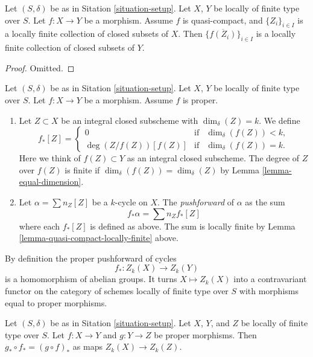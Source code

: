 \begin{lemma}
\label{lemma-quasi-compact-locally-finite}
Let $(S, \delta)$ be as in Sitation \ref{situation-setup}.
Let $X$, $Y$ be locally of finite type over $S$.
Let $f : X \to Y$ be a morphism.
Assume $f$ is quasi-compact, and $\{Z_i\}_{i \in I}$ is a locally
finite collection of closed subsets of $X$.
Then $\{\overline{f(Z_i)}\}_{i \in I}$ is a locally finite
collection of closed subsets of $Y$.
\end{lemma}

\begin{proof}
Omitted.
\end{proof}

\begin{definition}
\label{definition-proper-pushforward}
Let $(S, \delta)$ be as in Sitation \ref{situation-setup}.
Let $X$, $Y$ be locally of finite type over $S$.
Let $f : X \to Y$ be a morphism.
Assume $f$ is proper.
\begin{enumerate}
\item Let $Z \subset X$ be an integral closed subscheme
with $\dim_\delta(Z) = k$. We define
$$
f_*[Z] =
\left\{
\begin{matrix}
0 & \text{if} & \dim_\delta(f(Z))< k, \\
\deg(Z/f(Z)) [f(Z)] & \text{if} & \dim_\delta(f(Z)) = k.
\end{matrix}
\right.
$$
Here we think of $f(Z) \subset Y$ as an integral closed subscheme.
The degree of $Z$ over $f(Z)$ is finite if
$\dim_\delta(f(Z)) = \dim_\delta(Z)$
by Lemma \ref{lemma-equal-dimension}.
\item Let $\alpha = \sum n_Z [Z]$ be a $k$-cycle on $X$. The
{\it pushforward} of $\alpha$ as the sum
$$
f_* \alpha = \sum n_Z f_*[Z]
$$
where each $f_*[Z]$ is defined as above. The sum is locally finite
by Lemma \ref{lemma-quasi-compact-locally-finite} above.
\end{enumerate}
\end{definition}

\noindent
By definition the proper pushforward of cycles
$$
f_* : Z_k(X) \longrightarrow Z_k(Y)
$$
is a homomorphism of abelian groups. It turns $X \mapsto Z_k(X)$
into a contravariant functor on the category of schemes locally of
finite type over $S$ with morphisms equal to proper morphisms.

\begin{lemma}
\label{lemma-compose-pushforward}
Let $(S, \delta)$ be as in Sitation \ref{situation-setup}.
Let $X$, $Y$, and $Z$ be locally of finite type over $S$.
Let $f : X \to Y$ and $g : Y \to Z$ be proper morphisms.
Then $g_* \circ f_* = (g \circ f)_*$ as maps $Z_k(X) \to Z_k(Z)$.
\end{lemma}

